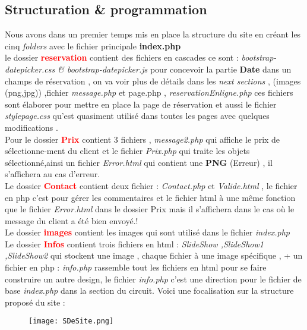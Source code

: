 \documentclass[a4paper,12pt]{report}
\begin{document}
\subsection{Structuration \& programmation}
Nous avons dans un premier temps mis en place la structure du site en créant les cinq \textit{folders} avec le fichier principale \textbf{index.php} \\
le dossier \textcolor{red}{\textbf{reservation}} contient des fichiers en cascades ce sont : \textit{bootstrap-datepicker.css \& bootstrap-datepicker.js} pour concevoir la partie \textbf{Date} dans un champs de réservation , on va voir plus de détails dans les \textit{next sections} , (images (png,jpg)) ,fichier \textit{message.php} et page.php , \textit{reservationEnligne.php} ces fichiers sont élaborer pour mettre en place la page de réservation et aussi le fichier \textit{stylepage.css} qu'est quasiment utilisé dans toutes les pages avec quelques modifications .\\
Pour le dossier \textcolor{red}{\textbf{Prix}} contient 3 fichiers , \textit{message2.php} qui affiche le prix de sélectionne-ment  du client et le fichier \textit{Prix.php} qui traite les objets sélectionné,ainsi un fichier \textit{Error.html} qui contient une \textbf{PNG} (Erreur) , il s'affichera au cas d'erreur.
\\
Le dossier \textcolor{red}{\textbf{Contact}} contient deux fichier : \textit{Contact.php} et \textit{Valide.html} , le fichier en php c'est pour gérer les commentaires et le fichier html à une même fonction que le fichier \textit{Error.html} dans le dossier Prix mais il s'affichera dans le cas où le message du client a été bien envoyé.! 
\\
Le dossier \textcolor{red}{\textbf{images}} contient les images qui sont utilisé dans le fichier \textit{index.php} \\
Le dossier  \textcolor{red}{\textbf{Infos}} contient trois fichiers en html : \textit{SlideShow ,SlideShow1 ,SlideShow2} qui stockent une image , chaque fichier à une image spécifique , + un fichier en php : \textit{info.php} rassemble tout les fichiers en html pour se faire construire un autre design, le fichier \textit{info.php} c'est une direction pour le fichier de base \textit{index.php} dans la section du circuit.
Voici une focalisation sur la structure proposé du site :
\begin{figure}[H]
\begin{center}
\centering
\texttt{[image: SDeSite.png]}
\end{center}
\label{Struct}
\end{figure}
\end{document}
